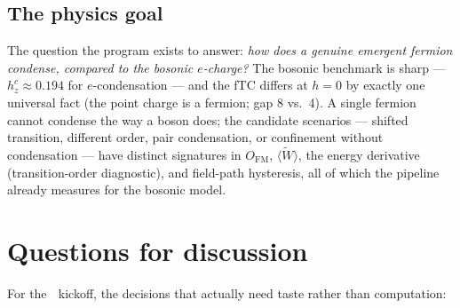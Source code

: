 \documentclass[11pt]{article}
\newcommand{\circled}[1]{\textcircled{\raisebox{-0.5pt}{\scriptsize #1}}}
\begin{document}
\subsection{The physics goal}
The question the program exists to answer: \emph{how does a genuine emergent
fermion condense, compared to the bosonic $e$-charge?} The bosonic benchmark
is sharp --- $h_z^c\approx0.194$ for $e$-condensation
\cite{Linsel2026,SignNote} --- and the fTC differs at $h=0$ by exactly one
universal fact (the point charge is a fermion; gap 8 vs.\ 4). A single
fermion cannot condense the way a boson does; the candidate scenarios ---
shifted transition, different order, pair condensation, or confinement
without condensation --- have distinct signatures in $O_{\mathrm{FM}}$,
$\langle\tilde W\rangle$, the energy derivative (transition-order
diagnostic), and field-path hysteresis, all of which the pipeline already
measures for the bosonic model.

\section{Questions for discussion}
\label{sec:questions}

For the \circled{3} kickoff, the decisions that actually need taste rather than
computation:
\end{document}
